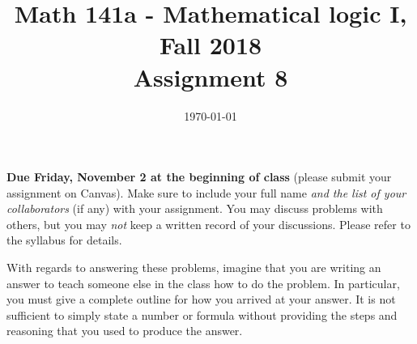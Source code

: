 \documentclass{amsart}
\title[Math 141a, Fall 2018: assignment 8]{Math 141a - Mathematical logic I, Fall 2018 \\ Assignment 8}
\date{\today}
\theoremstyle{definition}
\begin{document}

\maketitle

\textbf{Due Friday, November 2 at the beginning of class} (please submit your assignment on Canvas). Make sure to include your full name \emph{and the list of your collaborators} (if any) with your assignment. You may discuss problems with others, but you may \emph{not} keep a written record of your discussions. Please refer to the syllabus for details.

With regards to answering these problems, imagine that you are writing an answer to teach someone else in the class how to do the problem. In particular, you must give a complete outline for how you arrived at your answer. It is not sufficient to simply state a number or formula without providing the steps and reasoning that you used to produce the answer.
\end{document}
